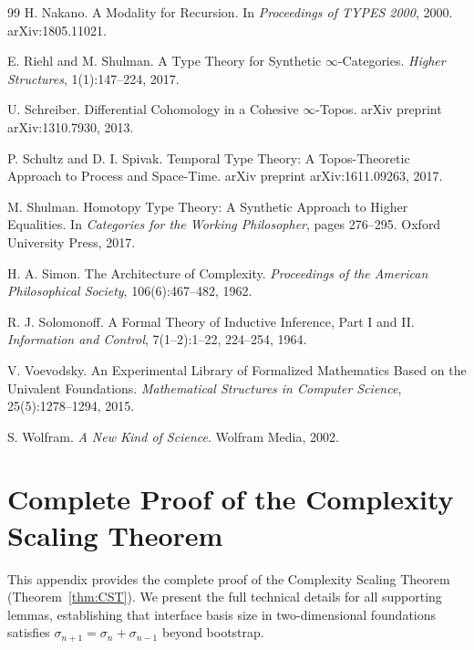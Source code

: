 \documentclass[11pt]{article}
\theoremstyle{definition}
\theoremstyle{remark}
\begin{document}
\begin{thebibliography}{99}
H. Nakano.
A Modality for Recursion.
In \textit{Proceedings of TYPES 2000}, 2000. arXiv:1805.11021.

E. Riehl and M. Shulman.
A Type Theory for Synthetic $\infty$-Categories.
\textit{Higher Structures}, 1(1):147--224, 2017.

U. Schreiber.
Differential Cohomology in a Cohesive $\infty$-Topos.
arXiv preprint arXiv:1310.7930, 2013.

P. Schultz and D. I. Spivak.
Temporal Type Theory: A Topos-Theoretic Approach to Process and Space-Time.
arXiv preprint arXiv:1611.09263, 2017.

M. Shulman.
Homotopy Type Theory: A Synthetic Approach to Higher Equalities.
In \textit{Categories for the Working Philosopher}, pages 276--295. Oxford University Press, 2017.

H. A. Simon.
The Architecture of Complexity.
\textit{Proceedings of the American Philosophical Society}, 106(6):467--482, 1962.

R. J. Solomonoff.
A Formal Theory of Inductive Inference, Part I and II.
\textit{Information and Control}, 7(1--2):1--22, 224--254, 1964.

V. Voevodsky.
An Experimental Library of Formalized Mathematics Based on the Univalent Foundations.
\textit{Mathematical Structures in Computer Science}, 25(5):1278--1294, 2015.

S. Wolfram.
\textit{A New Kind of Science}.
Wolfram Media, 2002.

\end{thebibliography}

\appendix

\section{Complete Proof of the Complexity Scaling Theorem}
\label{app:CST-proof}

This appendix provides the complete proof of the Complexity Scaling Theorem (Theorem~\ref{thm:CST}).
We present the full technical details for all supporting lemmas, establishing that interface basis
size in two-dimensional foundations satisfies $\sigma_{n+1} = \sigma_n + \sigma_{n-1}$ beyond bootstrap.
\end{document}
